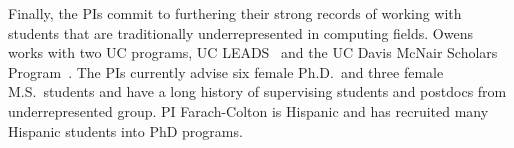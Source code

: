 Finally, the PIs commit to furthering their strong records of working with students that are traditionally underrepresented in computing fields. Owens works with two UC programs, UC LEADS~\cite{UCLeads:2003:WEB} and the UC Davis McNair Scholars Program~\cite{McNair:2003:WEB}.  The PIs currently advise six female Ph.D.\ and three female M.S.\ students and have a long history of supervising students and postdocs from underrepresented group.  
PI Farach-Colton is Hispanic and has recruited many Hispanic students into PhD programs.


